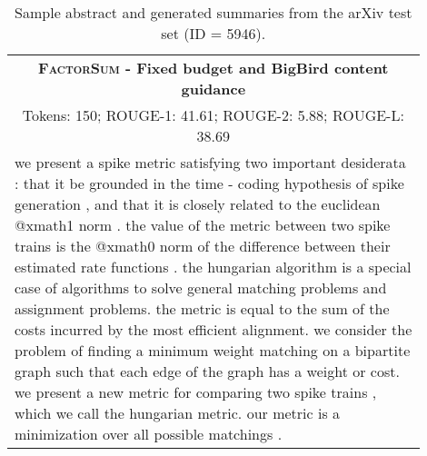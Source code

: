 \documentclass[11pt,table]{article}
\newcommand{\modelname}{FactorSum}
\begin{document}
\begin{table*}[ht]
\begin{tabular}{p{0.9\linewidth}}
    \midrule
    \multicolumn{1}{c}{\textbf{\textsc{\modelname} - Fixed budget and BigBird content guidance}} \\
    \multicolumn{1}{c}{Tokens: 150; ROUGE-1: 41.61; ROUGE-2: 5.88; ROUGE-L: 38.69} \\
    \midrule
    we present a spike metric satisfying two important desiderata : that it be grounded in the time - coding hypothesis of spike generation , and that it is closely related to the euclidean @xmath1 norm . the value of the metric between two spike trains is the @xmath0 norm of the difference between their estimated rate functions . the hungarian algorithm is a special case of algorithms to solve general matching problems and assignment problems. the metric is equal to the sum of the costs incurred by the most efficient alignment. we consider the problem of finding a minimum weight matching on a bipartite graph such that each edge of the graph has a weight or cost. we present a new metric for comparing two spike trains , which we call the hungarian metric. our metric is a minimization over all possible matchings .\\
    \bottomrule
  \end{tabular}
  \caption{Sample abstract and generated summaries from the arXiv test set (ID = 5946).} \label{tab:summary_sample_arxiv1}
\end{table*}
\end{document}
